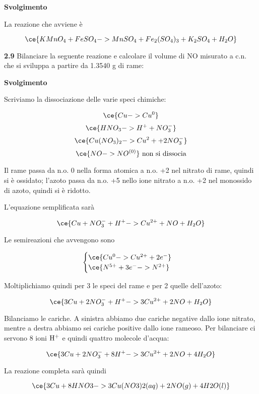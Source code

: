\large\textbf{Svolgimento}\normalsize

\vspace{0.2cm}La reazione che avviene è

$$\ce{KMnO_4 + FeSO_4 -> MnSO_4 + Fe_2(SO_4)_3 + K_2SO_4 + H_2O}$$

\vspace{0.2cm}\textbf{2.9} Bilanciare la seguente reazione e calcolare il volume di NO misurato a c.n. che si sviluppa a
partire da 1.3540 g di rame:

\begin{center}
\end{center}

\large\textbf{Svolgimento}\normalsize

\vspace{0.2cm}Scriviamo la dissociazione delle varie speci chimiche:

$$\ce{Cu -> Cu^0}$$
$$\ce{HNO_3 -> H^+ + NO_3^-}$$
$$\ce{Cu(NO_3)_2 -> Cu^2+ + 2NO_3^-}$$
$$\ce{NO -> NO^{(0)}} \text{ non si dissocia}$$

Il rame passa da n.o. 0 nella forma atomica a n.o. +2 nel nitrato di rame, quindi si è ossidato; l'azoto passa da n.o. +5 nello ione nitrato a n.o. +2 nel monossido di azoto, quindi si è ridotto.

L'equazione semplificata sarà

$$\ce{Cu + NO_3^- + H^+ -> Cu^{2+} + NO + H_2O}$$

Le semireazioni che avvengono sono

$$\begin{cases}
    \ce{Cu^0 -> Cu^{2+} + 2e^-}\\
    \ce{N^{5+} + 3e^- -> N^{2+}}
\end{cases}$$

Moltiplichiamo quindi per 3 le speci del rame e per 2 quelle dell'azoto:

$$\ce{3Cu + 2NO_3^- + H^+ -> 3Cu^{2+} + 2NO + H_2O}$$

Bilanciamo le cariche. A sinistra abbiamo due cariche negative dallo ione nitrato, mentre a destra abbiamo sei cariche positive dallo ione rameoso. Per bilanciare ci servono 8 ioni $\rm H^+$ e quindi quattro molecole d'acqua:

$$\ce{3Cu + 2NO_3^- + 8H^+ -> 3Cu^{2+} + 2NO + 4H_2O}$$

La reazione completa sarà quindi

$$\ce{3Cu + 8HNO3 -> 3Cu(NO3)2(aq) + 2NO(g) + 4H2O(l)}$$

